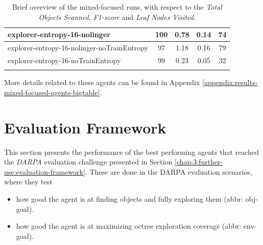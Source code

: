 \begin{longtable}{|l|c|c|c|c|}
explorer-entropy-16-nolinger & 100 & {\cellcolor[HTML]{B9DAD3}} \color[HTML]{000000} 0.78 & {\cellcolor[HTML]{EBF2F0}} \color[HTML]{000000} 0.14 & {\cellcolor[HTML]{CCE3DE}} \color[HTML]{000000} 74 \\ \hline
explorer-entropy-16-nolinger-noTrainEntropy & 97 & {\cellcolor[HTML]{97CABF}} \color[HTML]{000000} 1.18 & {\cellcolor[HTML]{EBF2F0}} \color[HTML]{000000} 0.16 & {\cellcolor[HTML]{CAE2DD}} \color[HTML]{000000} 79 \\ \hline
explorer-entropy-16-noTrainEntropy & 99 & {\cellcolor[HTML]{E7F0EE}} \color[HTML]{000000} 0.23 & {\cellcolor[HTML]{EBF2F0}} \color[HTML]{000000} 0.05 & {\cellcolor[HTML]{DEECE9}} \color[HTML]{000000} 32 \\ \hline

    \caption{Brief overview of the mixed-focused runs, with respect to the \textit{Total Objects Scanned}, \textit{F1-score} and \textit{Leaf Nodes Visited}.}
    \label{tab:results-mixed-agents}
\end{longtable}


More details related to these agents can be found in Appendix \ref{appendix:results-mixed-focused-agents-bigtable}.

\newpage


\section{Evaluation Framework}\label{chap:4:evaluation_framework} 
This section presents the performance of the best performing agents that reached the \textit{DARPA} evaluation challenge presented in Section \ref{chap:3:further-use:evaluation-framework}. 
These are done in the DARPA evaluation scenarios, where they test
\begin{itemize}
    \item how good the agent is at finding objects and fully exploring them (abbr: obj-goal).
    \item how good the agent is at maximizing octree exploration coverage (abbr: env-goal).
\end{itemize}

% 


